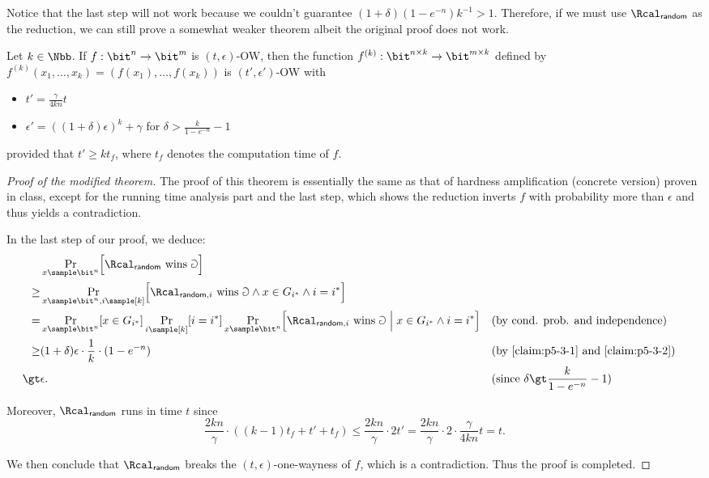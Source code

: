 \begin{answer}[iii]
    Notice that the last step will not work because we couldn't guarantee $(1+\delta)(1-e^{-n})k^{-1} \gt 1$.  Therefore, if we must use $\Rcal_{\textsf{random}}$ as the reduction, we can still prove a somewhat weaker theorem albeit the original proof does not work.
    \begin{theorem*}
        Let $k\in\Nbb$. If $f:\bit^n\to \bit^m$ is $(t,\epsilon)$-OW, then the function $f^{(k)}:\bit^{n\times k}\to \bit^{m\times k}$ defined by $f^{(k)}(x_1,\ldots,x_k)=(f(x_1),\ldots,f(x_k))$ is $(t',\epsilon')$-OW with
        \begin{itemize}
            \item $t'=\frac{\gamma}{4kn}t$
            \item $\epsilon' = ((1+\delta)\epsilon)^k+\gamma$ for $\delta \gt \frac{k}{1-e^{-n}}-1$
        \end{itemize}
        provided that $t'\ge kt_f$, where $t_f$ denotes the computation time of $f$.
    \end{theorem*}
    \begin{proof}[Proof of the modified theorem]
        The proof of this theorem is essentially the same as that of hardness amplification (concrete version) proven in class, except for the running time analysis part and the last step, which shows the reduction inverts $f$ with probability more than $\epsilon$ and thus yields a contradiction.

        In the last step of our proof, we deduce:
        \begin{align*}
            &\Pr_{x\sample\bit^n}\Bigl[ \Rcal_{\textsf{random}} \textrm{ wins } \Game \Bigr]\\
            \ge&  \Pr_{x\sample\bit^n,i\sample [k]}\Bigl[ \Rcal_{\textsf{random},i} \textrm{ wins } \Game \land x\in G_{i^\ast} \land i=i^\ast \Bigr]\\
            =&   \Pr_{x\sample\bit^n}[x\in G_{i^\ast}]  \Pr_{i\sample [k]}[i=i^\ast] \Pr_{x\sample\bit^n}\Bigl[ \Rcal_{\textsf{random},i} \textrm{ wins } \Game \Bigm\vert x\in G_{i^\ast} \land i=i^\ast \Bigr]
            &&\textrm{(by cond. prob. and independence)}\\
            \ge& (1+\delta)\epsilon \cdot \frac{1}{k} \cdot (1-e^{-n})
            &&\textrm{(by \autoref{claim:p5-3-1} and \autoref{claim:p5-3-2})}\\
            \gt& \epsilon.
            &&(\textrm{since } \delta\gt \frac{k}{1-e^{-n}}-1)
        \end{align*}

        Moreover, $\Rcal_{\textsf{random}}$ runs in time $t$ since
        \[
            \frac{2kn}{\gamma}\cdot ((k-1)t_f +t'+t_f)
            \le \frac{2kn}{\gamma}\cdot 2t'
            = \frac{2kn}{\gamma}\cdot 2\cdot \frac{\gamma}{4kn}t
            =t.
        \]

        We then conclude that $\Rcal_{\textsf{random}}$  breaks the $(t,\epsilon)$-one-wayness of $f$, which is a contradiction. Thus the proof is completed.
    \end{proof}
    
\end{answer}
